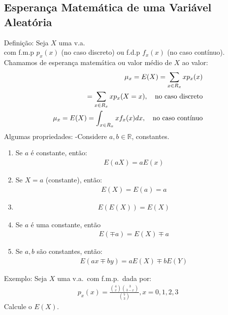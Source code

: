 \documentclass[11pt,a4paper]{book}
\begin{document}
\begin{enumerate}[label=(\alph*)]
\begin{enumerate}
\section{Esperança Matemática de uma Variável Aleatória}
Definição: Seja $X$ uma v.a.\\ com f.m.p $p_{x}(x)$ (no caso discreto) ou f.d.p
$f_{x}(x)$ (no caso contínuo). Chamamos de esperança matemática ou valor médio 
de $X$ ao valor: 
\begin{align}
  \mu_{x}= E(X)= \sum_{x \in R_{x}} x p_{x}(x)\\
  =\sum_{x \in R_{x}} x p_{x}(X=x), \text{\quad no caso discreto}\\
  \mu_{x}= E(X)= \int_{x \in R_{x}} x f_{x}(x)dx, \text{\quad no caso contínuo}
\end{align}
Algumas propriedades:
-Considere $a,b \in \mathbb{R}$, constantes.
\begin{enumerate}[label=(\alph*)]
  \item Se $a$ é constante, então: 
    \begin{align}
      E(aX)=aE(x)
    \end{align}
  \item Se $X=a$ (constante), então: 
    \begin{align}
      E(X)=E(a)=a
    \end{align}
  \item 
    \begin{align}    E(E(X))= E(X)\end{align}
  \item Se $a$ é uma constante, então 
    \begin{align}  E(\mp a)=E(X)\mp a\end{align}
  \item Se $a,b$ são constantes, então: 
    \begin{align}  E(ax\mp by)=aE(X)\mp b E(Y)\end{align}
\end{enumerate}
Exemplo: Seja $X$ uma v.a.\ com f.m.p.\ dada por:
\begin{align}p_{x}(x)=\frac{\binom{4}{x}\binom{3}{3-x}}{\binom{7}{3}}, x=0,1,2,3\end{align}
Calcule o $E(X)$.


\end{enumerate}
\end{enumerate}
\end{document}
